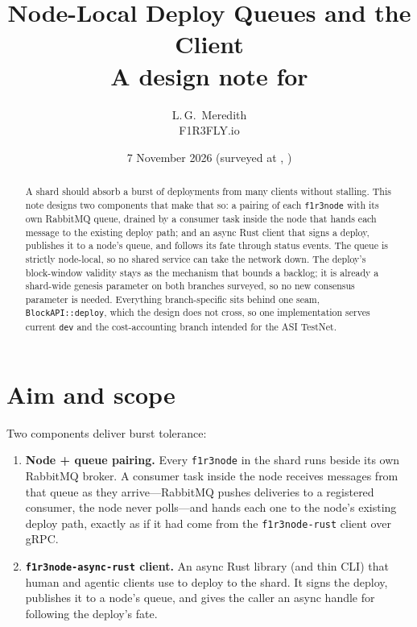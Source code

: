 \documentclass[11pt]{article}
\title{Node-Local Deploy Queues and the \code{f1r3node-async-rust} Client\\
  {\large A design note for \code{f1r3node-rust}}}
\author{L.\,G.\ Meredith\\ F1R3FLY.io}
\date{7 November 2026 \quad (surveyed at \dev{} \code{a79a6ce}, \ote{} \code{4c9853b})}
\newcommand{\code}[1]{\texttt{#1}}
\newcommand{\dev}{\code{dev}}
\begin{document}
\maketitle

\begin{abstract}
A shard should absorb a burst of deployments from many clients without stalling.
This note designs two components that make that so: a pairing of each
\code{f1r3node} with its own RabbitMQ queue, drained by a consumer task inside the
node that hands each message to the existing deploy path; and an async Rust client
that signs a deploy, publishes it to a node's queue, and follows its fate through
status events. The queue is strictly node-local, so no shared service can take the
network down. The deploy's block-window validity stays as the mechanism that bounds a
backlog; it is already a shard-wide genesis parameter on both branches surveyed, so
no new consensus parameter is needed. Everything branch-specific sits behind one
seam, \code{BlockAPI::deploy}, which the design does not cross, so one
implementation serves current \dev{} and the cost-accounting branch intended for the
ASI TestNet.
\end{abstract}

\tableofcontents

\section{Aim and scope}

Two components deliver burst tolerance:
\begin{enumerate}[leftmargin=2em]
  \item \textbf{Node + queue pairing.} Every \code{f1r3node} in the shard runs beside
    its own RabbitMQ broker. A consumer task inside the node receives messages from
    that queue as they arrive---RabbitMQ pushes deliveries to a registered consumer,
    the node never polls---and hands each one to the node's existing deploy path,
    exactly as if it had come from the \code{f1r3node-rust} client over gRPC.
  \item \textbf{\code{f1r3node-async-rust} client.} An async Rust library (and thin
    CLI) that human and agentic clients use to deploy to the shard. It signs the
    deploy, publishes it to a node's queue, and gives the caller an async handle for
    following the deploy's fate.
\end{enumerate}
\end{document}
